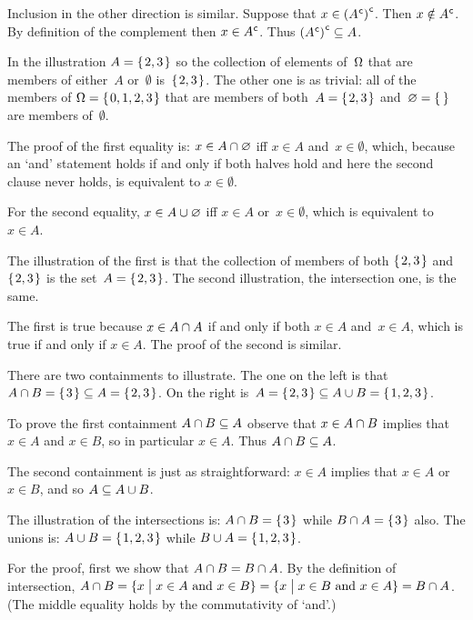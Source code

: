\documentclass{ibl}  %
\begin{document}
\begin{problem}
\begin{answer}
\begin{items}
  Inclusion in the other direction is similar.
  Suppose that $x\in{({A}^{\mspace{1mu}\mathsf{c}})}^{\mspace{1mu}\mathsf{c}}$.
  Then $x\notin{A}^{\mspace{1mu}\mathsf{c}}$.
  By definition of the complement then $x\in{A}^{\mspace{1mu}\mathsf{c}}$.
  Thus ${({A}^{\mspace{1mu}\mathsf{c}})}^{\mspace{1mu}\mathsf{c}}\subseteq A$. 
\item In the illustration $A=\mbox{$\{\hspace{0.1em}2,3\hspace{0.1em}\}$}$ so the collection of
  elements of~$\Omega$ that are members of either~$A$ or~$\emptyset$
  is~$\mbox{$\{\hspace{0.1em}2,3\hspace{0.1em}\}$}$.
  The other one is as trivial: all of the members of 
  $\Omega=\mbox{$\{\hspace{0.1em}0,1,2,3\hspace{0.1em}\}$}$ that are members of both~$A=\mbox{$\{\hspace{0.1em}2,3\hspace{0.1em}\}$}$
  and~$\emptyset=\set{}$ are members of~$\emptyset$.

  The proof of the first equality is: $x\in A\cap\varnothing$
  iff $x\in A$ and~$x\in\emptyset$, 
  which, because an `and' statement holds if and only if both halves hold
  and here the second clause never holds,
  is equivalent to $x\in\emptyset$. 

  For the second equality, 
  $x\in A\cup\varnothing$ iff $x\in A$ or~$x\in\emptyset$,
  which is equivalent to $x\in A$.
\item The illustration of the first is that the collection of members of both
  $\mbox{$\{\hspace{0.1em}2,3\hspace{0.1em}\}$}$ and~$\mbox{$\{\hspace{0.1em}2,3\hspace{0.1em}\}$}$ is the set~$A=\mbox{$\{\hspace{0.1em}2,3\hspace{0.1em}\}$}$.
  The second illustration, the intersection one, is the same.

  The first is true because
  $x\in A\cap A$ if and only if
  both $x\in A$ and~$x\in A$, 
  which is true if and only if $x\in A$.
  The proof of the second is similar.
\item There are two containments to illustrate.
  The one on the left is that $A\cap B=\mbox{$\{\hspace{0.1em}3\hspace{0.1em}\}$}\subseteq A=\mbox{$\{\hspace{0.1em}2,3\hspace{0.1em}\}$}$.
  On the right is~$A=\mbox{$\{\hspace{0.1em}2,3\hspace{0.1em}\}$}\subseteq A\cup B=\mbox{$\{\hspace{0.1em}1,2,3\hspace{0.1em}\}$}$.

  To prove the first containment $A\cap B\subseteq A$ observe that 
  $x\in A\cap B$ implies that
  $x\in A$ and $x\in B$, so in particular $x\in A$.
  Thus $A\cap B\subseteq A$.

  The second containment is just as straightforward:
  $x\in A$ implies that $x\in A$ or~$x\in B$, and so $A\subseteq A\cup B$.
\item The illustration of the intersections is: $A\cap B=\mbox{$\{\hspace{0.1em}3\hspace{0.1em}\}$}$
  while $B\cap A=\mbox{$\{\hspace{0.1em}3\hspace{0.1em}\}$}$ also.
  The unions is: $A\cup B=\mbox{$\{\hspace{0.1em}1,2,3\hspace{0.1em}\}$}$ while $B\cup A=\mbox{$\{\hspace{0.1em}1,2,3\hspace{0.1em}\}$}$.

  For the proof, first we show that
  $A\cap B=B\cap A$.
  By the definition of intersection,  
  $A\cap B=\{x \bigm| \text{$x\in A$ and $x\in B$}\}
    =\{x \bigm| \text{$x\in B$ and $x\in A$}\}=B\cap A$.
  (The middle equality holds by the commutativity of `and'.)


\end{items}
\end{answer}
\end{problem}
\end{document}
